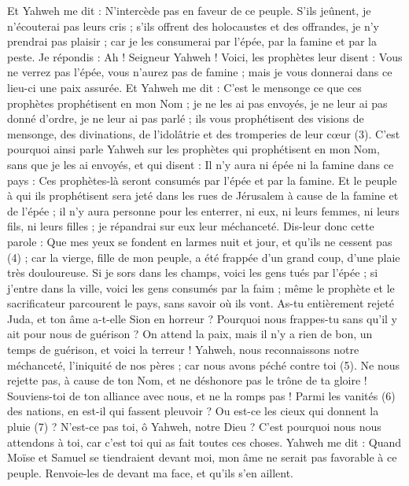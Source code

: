 \begin{multicols}{2}
Et Yahweh me dit : N’intercède pas en faveur de ce peuple.
S’ils jeûnent, je n'écouterai pas leurs cris ; s’ils offrent des holocaustes et des offrandes, je n'y prendrai pas plaisir ; car je les consumerai par l'épée, par la famine et par la peste.
Je répondis : Ah ! Seigneur Yahweh ! Voici, les prophètes leur disent : Vous ne verrez pas l'épée, vous n'aurez pas de famine ; mais je vous donnerai dans ce lieu-ci une paix assurée.
Et Yahweh me dit : C’est le mensonge ce que ces prophètes prophétisent en mon Nom ; je ne les ai pas envoyés, je ne leur ai pas donné d’ordre, je ne leur ai pas parlé ; ils vous prophétisent des visions de mensonge, des divinations, de l’idolâtrie et des tromperies de leur cœur\FTNT{} (3).
C'est pourquoi ainsi parle Yahweh sur les prophètes qui prophétisent en mon Nom, sans que je les ai envoyés, et qui disent : Il n’y aura ni épée ni la famine dans ce pays : Ces prophètes-là seront consumés par l'épée et par la famine.
Et le peuple à qui ils prophétisent sera jeté dans les rues de Jérusalem à cause de la famine et de l'épée ; il n'y aura personne pour les enterrer, ni eux, ni leurs femmes, ni leurs fils, ni leurs filles ; je répandrai sur eux leur méchanceté.
Dis-leur donc cette parole : Que mes yeux se fondent en larmes nuit et jour, et qu'ils ne cessent pas\FTNT{} (4) ; car la vierge, fille de mon peuple, a été frappée d’un grand coup, d’une plaie très douloureuse.
Si je sors dans les champs, voici les gens tués par l'épée ; si j'entre dans la ville, voici les gens consumés par la faim ; même le prophète et le sacrificateur parcourent le pays, sans savoir où ils vont.
As-tu entièrement rejeté Juda, et ton âme a-t-elle Sion en horreur ? Pourquoi nous frappes-tu sans qu'il y ait pour nous de guérison ? On attend la paix, mais il n'y a rien de bon, un temps de guérison, et voici la terreur !
Yahweh, nous reconnaissons notre méchanceté, l'iniquité de nos pères ; car nous avons péché contre toi\FTNT{} (5).
Ne nous rejette pas, à cause de ton Nom, et ne déshonore pas le trône de ta gloire ! Souviens-toi de ton alliance avec nous, et ne la romps pas !
Parmi les vanités\FTNT{} (6) des nations, en est-il qui fassent pleuvoir ? Ou est-ce les cieux qui donnent la pluie\FTNT{} (7) ? N'est-ce pas toi, ô Yahweh, notre Dieu ? C'est pourquoi nous nous attendons à toi, car c'est toi qui as fait toutes ces choses.
\VerseOne{}Yahweh me dit : Quand Moïse et Samuel se tiendraient devant moi, mon âme ne serait pas favorable à ce peuple. Renvoie-les de devant ma face, et qu'ils s’en aillent.

\end{multicols}
